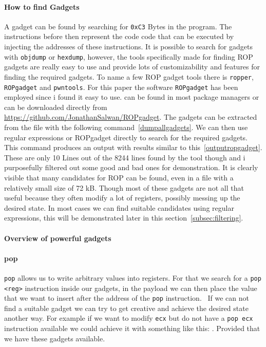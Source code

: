 \documentclass[journal=tosc,submission, notanonymous]{iacrtrans}
\begin{document}
\paragraph{How to find Gadgets}
\label{par:ropgadget}
A gadget can be found by searching for \Verb+0xC3+ Bytes in the program. The instructions before then represent the code code that can be executed by injecting the addresses of these instructions. It is possible to search for gadgets with \Verb+objdump+ or \Verb+hexdump+, however, the tools specifically made for finding ROP gadgets are really easy to use and provide lots of customizability and features for finding the required gadgets. To name a few ROP gadget tools there is \Verb+ropper+, \Verb+ROPgadget+ and \Verb+pwntools+. For this paper the software \Verb+ROPgadget+ has been employed since i found it easy to use.  can be found in most package managers or can be downloaded directly from \url{https://github.com/JonathanSalwan/ROPgadget}. The gadgets can be extracted from the file with the following command~\cref{dumpallgadgets}. We can then use regular expressions or ROPgadget directly to search for the required gadgets.
This command produces an output with results similar to this~\cref{outputropgadget}.
These are only 10 Lines out of the 8244 lines found by the tool though and i purposefully filtered out some good and bad ones for demonstration. It is clearly visible that many candidates for ROP can be found, even in a file with a relatively small size of 72 kB. Though most of these gadgets are not all that useful because they often modify a lot of registers, possibly messing up the desired state. In most cases we can find suitable candidates using regular expressions, this will be demonstrated later in this section~\cref{subsec:filtering}.
\paragraph{Overview of powerful gadgets}
\paragraph{pop}
\Verb+pop+ allows us to write arbitrary values into registers. For that we search for a \Verb+pop <reg>+ instruction inside our gadgets, in the payload we can then place the value that we want to insert after the address of the \Verb+pop+ instruction.~\cite{ropsla} If we can not find a suitable gadget we can try to get creative and achieve the desired state another way. For example if we want to modify \Verb+ecx+ but do not have a \Verb+pop ecx+ instruction available we could achieve it with something like this: . Provided that we have these gadgets available.
\end{document}
